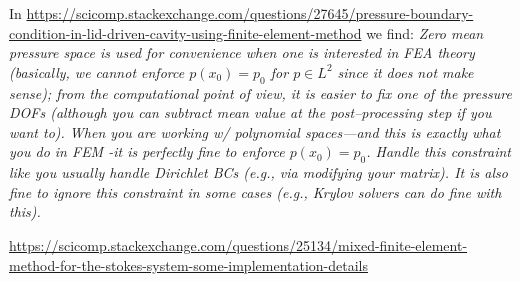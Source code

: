 In \url{https://scicomp.stackexchange.com/questions/27645/pressure-boundary-condition-in-lid-driven-cavity-using-finite-element-method}
we find:
{\it 
Zero mean pressure space is used for convenience when one is interested in FEA theory (basically, we cannot 
enforce $p(x_0)=p_0$ for $p \in L^2$ since it does not make sense); from the computational point of view, 
it is easier to fix one of the pressure DOFs (although you can subtract mean value at the post–processing step 
if you want to). When you are working w/ polynomial spaces—and this is exactly what you do in FEM 
-it is perfectly fine to enforce $p(x_0)=p_0$. Handle this constraint like you usually handle Dirichlet 
BCs (e.g., via modifying your matrix). It is also fine to ignore this constraint in some 
cases (e.g., Krylov solvers can do fine with this).
}


\url{
https://scicomp.stackexchange.com/questions/25134/mixed-finite-element-method-for-the-stokes-system-some-implementation-details}





